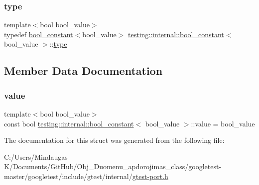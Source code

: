 \mbox{\label{structtesting_1_1internal_1_1bool__constant_aba6d09ecf7eecea6c93480f0d627a167}} 
\subsubsection{\texorpdfstring{type}{type}\hspace{0.1cm}{\footnotesize\ttfamily [3/3]}}
{\footnotesize\ttfamily template$<$bool bool\+\_\+value$>$ \\
typedef \mbox{\hyperlink{structtesting_1_1internal_1_1bool__constant}{bool\+\_\+constant}}$<$bool\+\_\+value$>$ \mbox{\hyperlink{structtesting_1_1internal_1_1bool__constant}{testing\+::internal\+::bool\+\_\+constant}}$<$ bool\+\_\+value $>$\+::\mbox{\hyperlink{structtesting_1_1internal_1_1bool__constant_aba6d09ecf7eecea6c93480f0d627a167}{type}}}



\subsection{Member Data Documentation}
\mbox{\label{structtesting_1_1internal_1_1bool__constant_a499fba6576296b04d99690a486424b32}} 
\subsubsection{\texorpdfstring{value}{value}}
{\footnotesize\ttfamily template$<$bool bool\+\_\+value$>$ \\
const bool \mbox{\hyperlink{structtesting_1_1internal_1_1bool__constant}{testing\+::internal\+::bool\+\_\+constant}}$<$ bool\+\_\+value $>$\+::value = bool\+\_\+value\hspace{0.3cm}{\ttfamily [static]}}



The documentation for this struct was generated from the following file\+:\begin{DoxyCompactItemize}
\item 
C\+:/\+Users/\+Mindaugas K/\+Documents/\+Git\+Hub/\+Obj\+\_\+\+Duomenu\+\_\+apdorojimas\+\_\+class/googletest-\/master/googletest/include/gtest/internal/\mbox{\hyperlink{googletest-master_2googletest_2include_2gtest_2internal_2gtest-port_8h}{gtest-\/port.\+h}}\end{DoxyCompactItemize}
